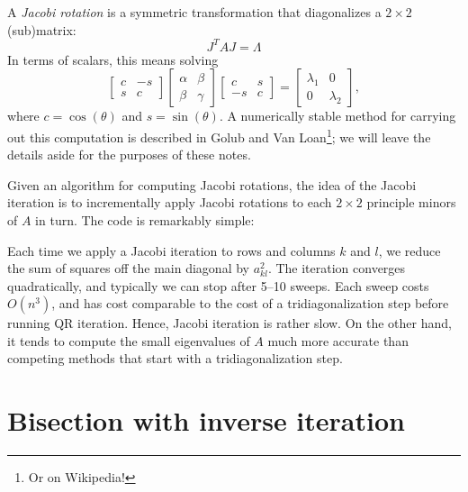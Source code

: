 \documentclass[12pt, leqno]{article} %
\begin{document}
A {\em Jacobi rotation} is a symmetric transformation that
diagonalizes a $2 \times 2$ (sub)matrix:
\[
  J^T A J = \Lambda
\]
In terms of scalars, this means solving
\[
  \begin{bmatrix} c & -s \\ s & c \end{bmatrix}
  \begin{bmatrix} \alpha & \beta \\ \beta & \gamma \end{bmatrix}
  \begin{bmatrix} c & s \\ -s & c \end{bmatrix} =
  \begin{bmatrix} \lambda_1 & 0 \\ 0 & \lambda_2 \end{bmatrix},
\]
where $c = \cos(\theta)$ and $s = \sin(\theta)$.  A numerically
stable method for carrying out this computation is described in
Golub and Van Loan\footnote{Or on Wikipedia!}; we will leave
the details aside for the purposes of these notes.

Given an algorithm for computing Jacobi rotations, the idea
of the Jacobi iteration is to incrementally apply Jacobi rotations
to each $2 \times 2$ principle minors of $A$ in turn.  The code is
remarkably simple:



Each time we apply a Jacobi iteration to rows and columns $k$ and $l$,
we reduce the sum of squares off the main diagonal by $a_{kl}^2$. The
iteration converges quadratically, and typically we can stop after 5--10
sweeps.  Each sweep costs $O(n^3)$, and has cost comparable to the cost
of a tridiagonalization step before running QR iteration.  Hence, Jacobi
iteration is rather slow.  On the other hand, it tends to compute the
small eigenvalues of $A$ much more accurate than competing methods that
start with a tridiagonalization step.

\section{Bisection with inverse iteration}
\end{document}

